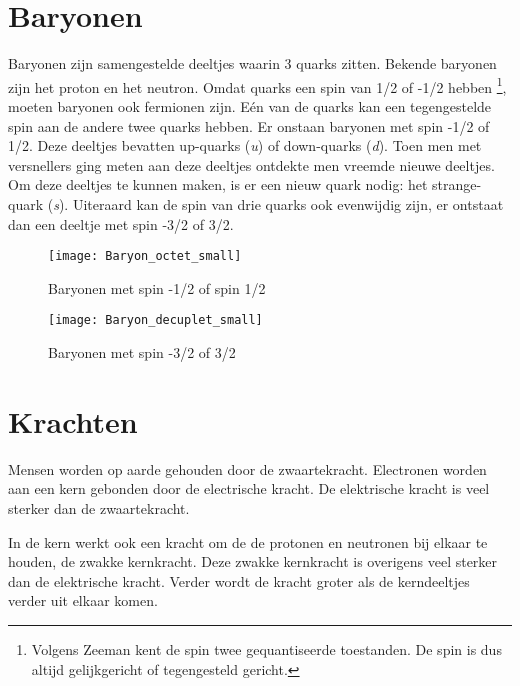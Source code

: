 \section{Baryonen}

Baryonen zijn samengestelde deeltjes waarin 3 quarks zitten. Bekende
baryonen zijn het proton en het neutron. Omdat quarks een spin van 1/2
of -1/2 hebben \footnote{Volgens Zeeman kent de spin twee gequantiseerde
toestanden. De spin is dus altijd gelijkgericht of tegengesteld
gericht.}, moeten baryonen ook fermionen zijn. Eén van de quarks kan een
tegengestelde spin aan de andere twee quarks hebben. Er onstaan baryonen
met spin -1/2 of 1/2. Deze deeltjes bevatten up-quarks (\emph{u}) of
down-quarks (\emph{d}). Toen men met versnellers ging meten aan deze
deeltjes ontdekte men vreemde nieuwe deeltjes. Om deze deeltjes te
kunnen maken, is er een nieuw quark nodig: het strange-quark (\emph{s}).
Uiteraard kan de spin van drie quarks ook evenwijdig zijn, er ontstaat
dan een deeltje met spin -3/2 of 3/2.

\begin{figure}[h]
\noindent \begin{centering}
\texttt{[image: Baryon\_octet\_small]}
\par\end{centering}

\caption{Baryonen met spin -1/2 of spin 1/2}
\end{figure}


\begin{figure}[H]
\noindent \begin{centering}
\texttt{[image: Baryon\_decuplet\_small]}
\par\end{centering}

\caption{Baryonen met spin -3/2 of 3/2}
\end{figure}



\section{Krachten}

Mensen worden op aarde gehouden door de zwaartekracht. Electronen
worden aan een kern gebonden door de electrische kracht. De elektrische
kracht is veel sterker dan de zwaartekracht. 

In de kern werkt ook een kracht om de de protonen en neutronen bij
elkaar te houden, de zwakke kernkracht. Deze zwakke kernkracht is
overigens veel sterker dan de elektrische kracht. Verder wordt de
kracht groter als de kerndeeltjes verder uit elkaar komen. 

